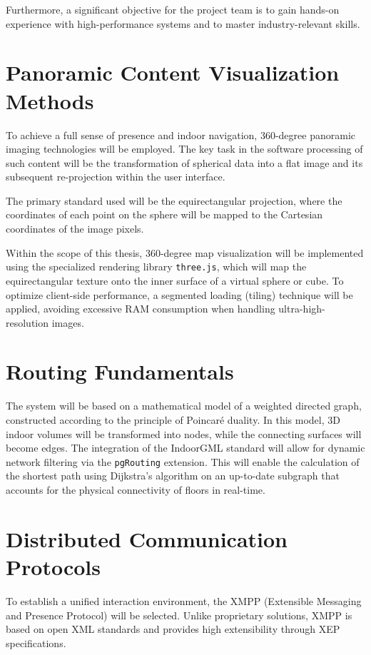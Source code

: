 \documentclass[a4paper, 14pt]{extreport}
\begin{document}
Furthermore, a significant objective for the project team is to gain hands-on experience with high-performance systems and to master industry-relevant skills.


\section{Panoramic Content Visualization Methods}
To achieve a full sense of presence and indoor navigation, 360-degree panoramic imaging technologies will be employed. The key task in the software processing of such content will be the transformation of spherical data into a flat image and its subsequent re-projection within the user interface.

The primary standard used will be the equirectangular projection, where the coordinates of each point on the sphere will be mapped to the Cartesian coordinates of the image pixels.

Within the scope of this thesis, 360-degree map visualization will be implemented using the specialized rendering library \texttt{three.js}, which will map the equirectangular texture onto the inner surface of a virtual sphere or cube. To optimize client-side performance, a segmented loading (tiling) technique will be applied, avoiding excessive RAM consumption when handling ultra-high-resolution images.

\section{Routing Fundamentals}
The system will be based on a mathematical model of a weighted directed graph, constructed according to the principle of Poincaré duality. In this model, 3D indoor volumes will be transformed into nodes, while the connecting surfaces will become edges. The integration of the IndoorGML standard will allow for dynamic network filtering via the \texttt{pgRouting} extension. This will enable the calculation of the shortest path using Dijkstra's algorithm on an up-to-date subgraph that accounts for the physical connectivity of floors in real-time.

\section{Distributed Communication Protocols}
To establish a unified interaction environment, the XMPP (Extensible Messaging and Presence Protocol) will be selected. Unlike proprietary solutions, XMPP is based on open XML standards and provides high extensibility through XEP specifications.
\end{document}
